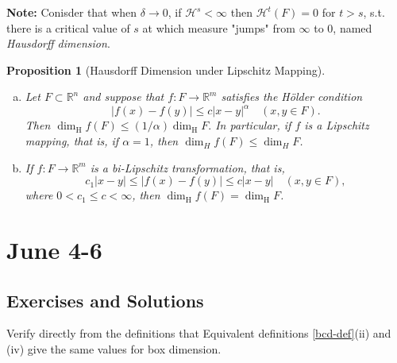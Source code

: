 \documentclass[12pt, a4paper]{article}
\newtheorem{proposition}{Proposition}[subsection]
\begin{document}
\textbf{Note: }Conisder that when $\delta\rightarrow 0$, if $\mathcal{H}^s<\infty$ then $\mathcal{H}^t(F) = 0$ for $t>s$, s.t. there is a critical value of $s$ at which measure "jumps" from $\infty$ to $0$, named \textit{Hausdorff dimension}.



\begin{proposition}[Hausdorff Dimension under Lipschitz Mapping]\label{H-under-L} $ $
    \begin{enumerate}[a.]
        \item Let $F \subset \mathbb{R}^{n}$ and suppose that $f: F \rightarrow \mathbb{R}^{m}$ satisfies the Hölder condition
$$
|f(x)-f(y)| \leq c|x-y|^{\alpha} \quad(x, y \in F) .
$$
Then $\operatorname{dim}_{\mathrm{H}} f(F) \leq(1 / \alpha) \operatorname{dim}_{\mathrm{H}} F .$ In particular, if $f$ is a Lipschitz
mapping, that is, if $\alpha=1$, then $\operatorname{dim}_{H} f(F) \leq \operatorname{dim}_{H} F$.
\item If $f: F \rightarrow \mathbb{R}^{m}$ is a bi-Lipschitz transformation, that is,
$$
c_{1}|x-y| \leq|f(x)-f(y)| \leq c|x-y| \quad(x, y \in F),
$$
where $0<c_{1} \leq c<\infty$, then $\operatorname{dim}_{\mathrm{H}} f(F)=\operatorname{dim}_{\mathrm{H}} F$.
    \end{enumerate}
\end{proposition}

\newpage
\section{June 4-6}
\subsection{Exercises and Solutions}

\begin{customexercise}{2.1}
    Verify directly from the definitions that Equivalent definitions \ref{bcd-def}(ii) and (iv) give the same values for box dimension.
\end{customexercise}
\end{document}
